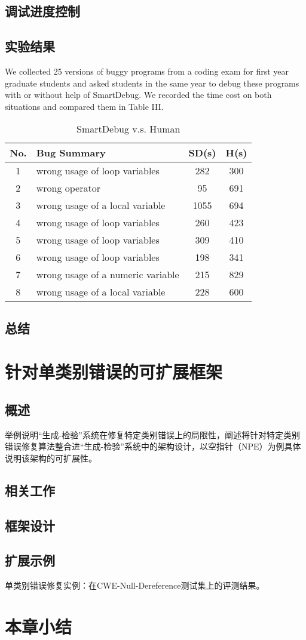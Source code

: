 \subsection{调试进度控制}%

\subsection{实验结果}%
We collected 25 versions of buggy programs from a coding exam for first year graduate students and asked students in the same year to debug these programs with or without help of SmartDebug. We recorded the time cost on both situations and compared them in Table III.

\begin{table}
	\label{tab:sd-vs-human}
	\centering
	\caption{SmartDebug v.s. Human}
	\vspace{-0.8em}
	\begin{tabular}{|c|l|c|c|} \hline
		No.& Bug Summary 									& SD(s) & H(s)	\\	\hline
		1  & wrong usage of loop variables					& 282	& 300	\\	\hline
		2  & wrong operator									& 95	& 691	\\	\hline
		3  & wrong usage of a local variable				& 1055	& 694	\\  \hline
		4  & wrong usage of loop variables					& 260	& 423	\\	\hline
		5  & wrong usage of loop variables					& 309	& 410	\\	\hline
		6  & wrong usage of loop variables					& 198	& 341 	\\	\hline
		7 & wrong usage of a numeric variable				& 215	& 829	\\	\hline
		8 & wrong usage of a local variable				& 228	& 600	\\	\hline
		
	\end{tabular}
\end{table}

\subsection{总结}%

\section{针对单类别错误的可扩展框架}%
\subsection{概述}%
举例说明“生成-检验”系统在修复特定类别错误上的局限性，阐述将针对特定类别错误修复算法整合进“生成-检验”系统中的架构设计，以空指针（NPE）为例具体说明该架构的可扩展性。
\subsection{相关工作}%
\subsection{框架设计}%
\subsection{扩展示例}%
单类别错误修复实例：在CWE-Null-Dereference测试集上的评测结果。
\section{本章小结}%